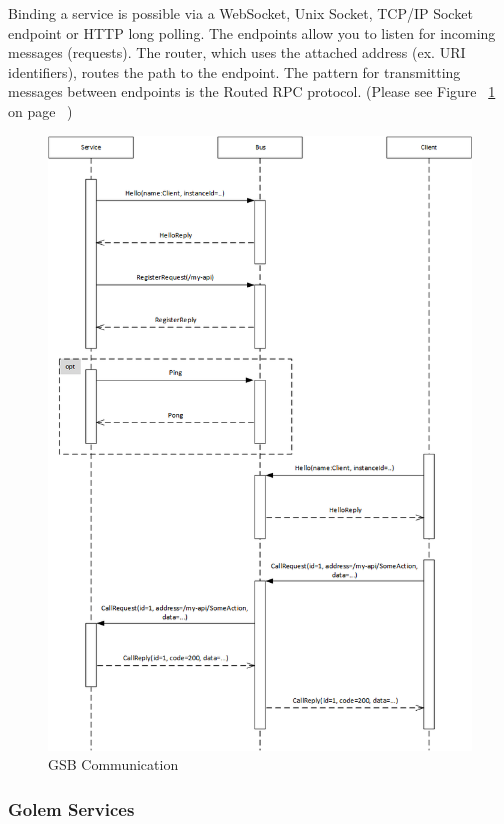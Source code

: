 Binding a service is possible via a WebSocket, Unix Socket, TCP/IP Socket endpoint or HTTP long polling.
The endpoints allow you to listen for incoming messages (requests).
The router, which uses the attached address (ex. URI identifiers), routes the path to the endpoint.
The pattern for transmitting messages between endpoints is the Routed RPC protocol.
(Please see Figure ~\ref{fig:GSBS} on page ~\pageref{fig:GSBS})

\begin{figure}[H]
    \centering
    \includegraphics[width=12cm,angle=0]{./diag/Sequence/GSBCommunication-B-Sequence.png}
	\caption{GSB Communication}
    \label{fig:GSBS}
\end{figure}


\subsubsection{Golem Services}



